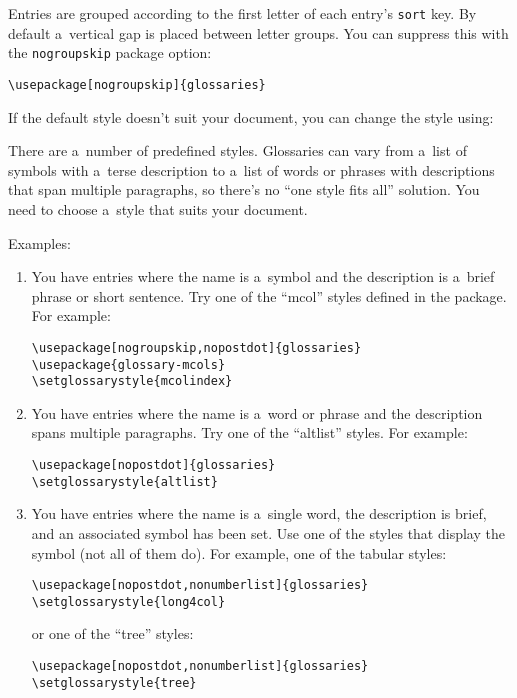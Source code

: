 \documentclass{nlctdoc}
\begin{document}
Entries are grouped according to the first letter of
each entry's \texttt{sort} key. By default a~vertical gap is placed
between letter groups. You can suppress this with the
\texttt{nogroupskip} package option:
\begin{verbatim}
\usepackage[nogroupskip]{glossaries}
\end{verbatim}

If the default style doesn't suit your document, you can change the
style using:
\begin{definition}
\end{definition}
There are a~number of predefined styles. Glossaries can vary from
a~list of symbols with a~terse description to a~list of words or
phrases with descriptions that span multiple paragraphs, so there's
no ``one style fits all'' solution. You need to choose a~style that
suits your document.

Examples:
\begin{enumerate}
 \item You have entries where the name is a~symbol and the
 description is a~brief phrase or short sentence. Try one of the 
 ``mcol'' styles defined in the  package. For example:
\begin{verbatim}
\usepackage[nogroupskip,nopostdot]{glossaries}
\usepackage{glossary-mcols}
\setglossarystyle{mcolindex}
\end{verbatim}

 \item You have entries where the name is a~word or phrase and the
description spans multiple paragraphs. Try one of the ``altlist'' styles. For
example:
\begin{verbatim}
\usepackage[nopostdot]{glossaries}
\setglossarystyle{altlist}
\end{verbatim}

 \item You have entries where the name is a~single word, the
  description is brief, and an associated symbol has been set.
  Use one of the styles that display the symbol (not all of them do). 
  For example, one of the tabular styles:
\begin{verbatim}
\usepackage[nopostdot,nonumberlist]{glossaries}
\setglossarystyle{long4col}
\end{verbatim}
or one of the ``tree'' styles:
\begin{verbatim}
\usepackage[nopostdot,nonumberlist]{glossaries}
\setglossarystyle{tree}
\end{verbatim}
\end{enumerate}
\end{document}
